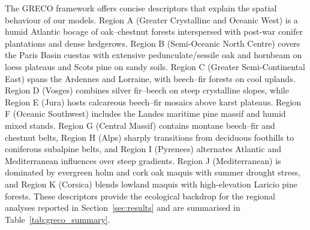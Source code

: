 \documentclass[utf8]{FrontiersinHarvard}
\begin{document}
The GRECO framework offers concise descriptors that explain the spatial behaviour of our models. Region A (Greater Crystalline and Oceanic West) is a humid Atlantic bocage of oak–chestnut forests interspersed with post-war conifer plantations and dense hedgerows. Region B (Semi-Oceanic North Centre) covers the Paris Basin cuestas with extensive pedunculate/sessile oak and hornbeam on loess plateaus and Scots pine on sandy soils. Region C (Greater Semi-Continental East) spans the Ardennes and Lorraine, with beech–fir forests on cool uplands. Region D (Vosges) combines silver fir–beech on steep crystalline slopes, while Region E (Jura) hosts calcareous beech–fir mosaics above karst plateaus. Region F (Oceanic Southwest) includes the Landes maritime pine massif and humid mixed stands. Region G (Central Massif) contains montane beech–fir and chestnut belts, Region H (Alps) sharply transitions from deciduous foothills to coniferous subalpine belts, and Region I (Pyrenees) alternates Atlantic and Mediterranean influences over steep gradients. Region J (Mediterranean) is dominated by evergreen holm and cork oak maquis with summer drought stress, and Region K (Corsica) blends lowland maquis with high-elevation Laricio pine forests. These descriptors provide the ecological backdrop for the regional analyses reported in Section~\ref{sec:results} and are summarised in Table~\ref{tab:greco_summary}.
\end{document}
